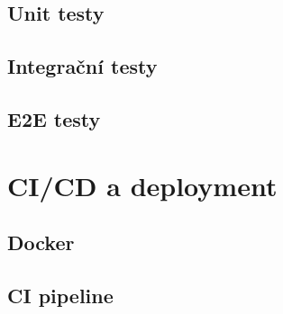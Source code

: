 
\subsection{Unit testy}


\subsection{Integrační testy}


\subsection{E2E testy}


\section{CI/CD a deployment}
\label{sec:cicd}


\subsection{Docker}


\subsection{CI pipeline}


